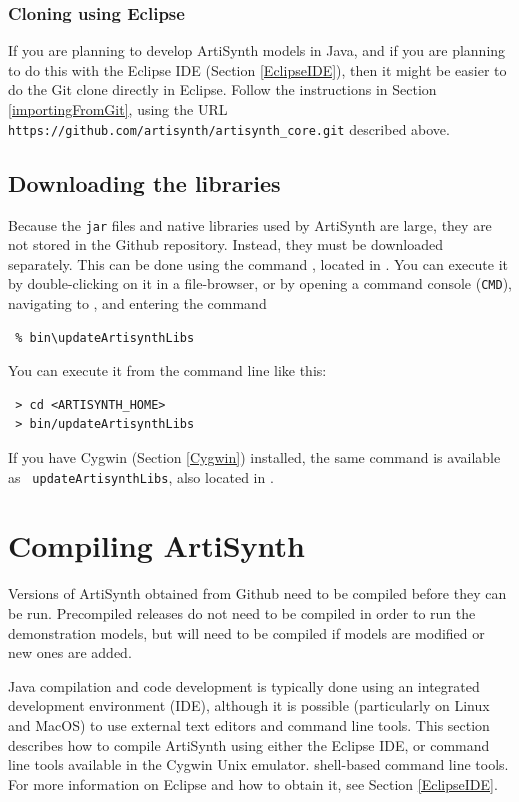 \subsubsection{Cloning using Eclipse}
\label{ArtiSynthEclipseCheckout}

If you are planning to develop ArtiSynth models in Java, and if you
are planning to do this with the Eclipse IDE
(Section \ref{EclipseIDE}), then it might be easier to do the Git
clone directly in Eclipse.  Follow the instructions in
Section \ref{importingFromGit}, using the URL {\tt
https://github.com/artisynth/artisynth\_core.git} described above.

\subsection{Downloading the libraries}
\label{DownloadingLibraries}

Because the {\tt jar} files and native libraries used by ArtiSynth
are large, they are not stored in the Github repository.
Instead, they must be downloaded separately. This can be
done using the command \updateArtisynthLibs, located
in .
\ifWindows
You can execute it by double-clicking on it in a file-browser, or
by opening a command console ({\tt CMD}), navigating
to \ArtHome[], and entering the command
\begin{verbatim}
 % bin\updateArtisynthLibs
\end{verbatim}
\else %
You can execute it from the command line like this:
\begin{verbatim}
 > cd <ARTISYNTH_HOME>
 > bin/updateArtisynthLibs
\end{verbatim}
\fi %

\ifWindows
If you have Cygwin (Section \ref{Cygwin}) installed, 
the same command is available as {\tt
updateArtisynthLibs}, also located in .
\else\fi %

\section{Compiling ArtiSynth}
\label{Compilation}

Versions of ArtiSynth obtained from Github need to be compiled before
they can be run. Precompiled releases do not need to be compiled in
order to run the demonstration models, but will need to be compiled if
models are modified or new ones are added.

Java compilation and code development is typically done using an
integrated development environment (IDE), although it is possible
(particularly on Linux and MacOS) to use external text editors and
command line tools. This section describes how to compile
ArtiSynth using either the Eclipse IDE, or
\ifWindows
command line tools available in the Cygwin Unix emulator.
\else
shell-based command line tools.
\fi
For more information on Eclipse and how to obtain it, see
Section \ref{EclipseIDE}.

